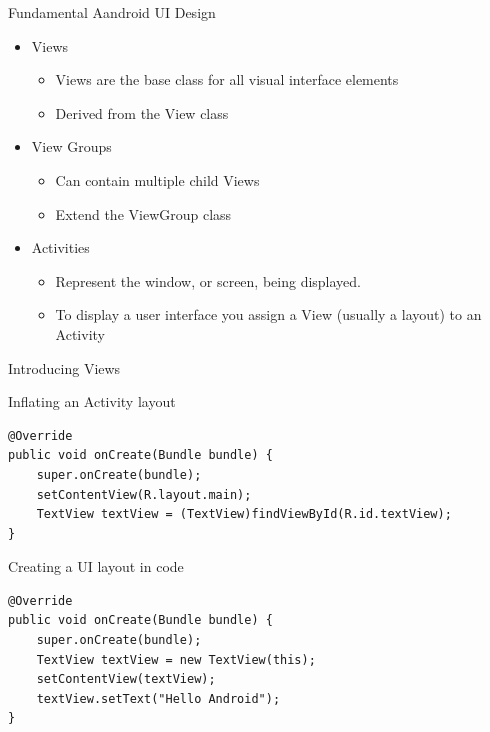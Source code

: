 \begin{frame}{Fundamental Aandroid UI Design}
\begin{itemize}
  \item Views
  \begin{itemize}
  \item Views are the base class for all visual interface elements
  \item Derived from the View class
  \end{itemize}
  \item View Groups
  \begin{itemize}
  \item Can contain multiple child Views
  \item Extend the ViewGroup class
  \end{itemize}
  \item Activities
  \begin{itemize}
  \item Represent the window, or screen, being displayed.
  \item To display a user interface you assign a View (usually a layout) to an Activity
  \end{itemize}
\end{itemize}
\end{frame}

\begin{frame}[fragile]{Introducing Views}
\begin{exampleblock}{Inflating an Activity layout}
\begin{lstlisting}
@Override
public void onCreate(Bundle bundle) {
    super.onCreate(bundle);
    setContentView(R.layout.main);
    TextView textView = (TextView)findViewById(R.id.textView);
}
\end{lstlisting}
\end{exampleblock}
\begin{exampleblock}{Creating a UI layout in code}
\begin{lstlisting}
@Override
public void onCreate(Bundle bundle) {
    super.onCreate(bundle);
    TextView textView = new TextView(this);
    setContentView(textView);
    textView.setText("Hello Android");
}
\end{lstlisting}
\end{exampleblock}
\end{frame}

